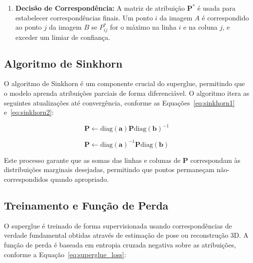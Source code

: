 \begin{enumerate}
    \begin{equation}
    \label{eq:optimal_transport}
    \mathbf{P}^* = \arg\min_{\mathbf{P} \in \mathcal{U}(\mathbf{a}, \mathbf{b})} \langle \mathbf{P}, -\mathbf{S} \rangle + \epsilon H(\mathbf{P})
    \end{equation}
    
    \noindent onde $\mathcal{U}(\mathbf{a}, \mathbf{b})$ é o conjunto de matrizes de transporte com margens $\mathbf{a}$ e $\mathbf{b}$, $H(\mathbf{P})$ é a entropia, e $\epsilon$ é um parâmetro de regularização;
    
    \item \textbf{Decisão de Correspondência:} A matriz de atribuição $\mathbf{P}^*$ é usada para estabelecer correspondências finais. Um ponto $i$ da imagem $A$ é correspondido ao ponto $j$ da imagem $B$ se $P^*_{ij}$ for o máximo na linha $i$ e na coluna $j$, e exceder um limiar de confiança.
\end{enumerate}

\subsection*{Algoritmo de Sinkhorn}

O algoritmo de Sinkhorn é um componente crucial do \gls{superglue}, permitindo que o modelo aprenda atribuições parciais de forma diferenciável. O algoritmo itera as seguintes atualizações até convergência, conforme as Equações~\ref{eq:sinkhorn1} e~\ref{eq:sinkhorn2}:

\begin{equation}
\label{eq:sinkhorn1}
\mathbf{P} \leftarrow \text{diag}(\mathbf{a}) \mathbf{P} \text{diag}(\mathbf{b})^{-1}
\end{equation}

\begin{equation}
\label{eq:sinkhorn2}
\mathbf{P} \leftarrow \text{diag}(\mathbf{a})^{-1} \mathbf{P} \text{diag}(\mathbf{b})
\end{equation}

Este processo garante que as somas das linhas e colunas de $\mathbf{P}$ correspondam às distribuições marginais desejadas, permitindo que pontos permaneçam não-correspondidos quando apropriado.

\subsection*{Treinamento e Função de Perda}

O \gls{superglue} é treinado de forma supervisionada usando correspondências de verdade fundamental obtidas através de estimação de pose ou reconstrução 3D. A função de perda é baseada em entropia cruzada negativa sobre as atribuições, conforme a Equação~\ref{eq:superglue_loss}:

